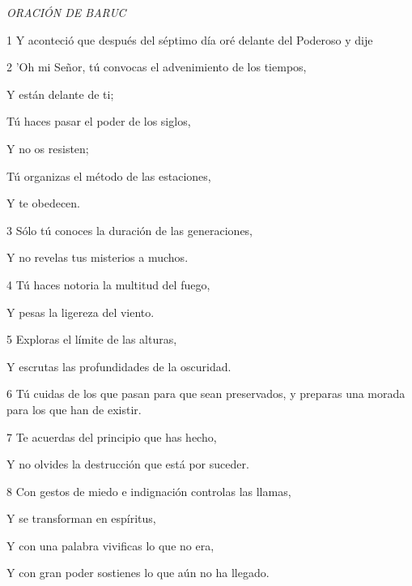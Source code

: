 \par \textit{ORACIÓN DE BARUC}

\par 1 Y aconteció que después del séptimo día oré delante del Poderoso y dije

\par 2 'Oh mi Señor, tú convocas el advenimiento de los tiempos,

\par Y están delante de ti;

Tú haces pasar el poder de los siglos,

\par Y no os resisten;

\par Tú organizas el método de las estaciones,

\par Y te obedecen.

\par 3 Sólo tú conoces la duración de las generaciones,

\par Y no revelas tus misterios a muchos.

\par 4 Tú haces notoria la multitud del fuego,

\par Y pesas la ligereza del viento.

\par 5 Exploras el límite de las alturas,

\par Y escrutas las profundidades de la oscuridad.

\par 6 Tú cuidas de los que pasan para que sean preservados, y preparas una morada para los que han de existir.

\par 7 Te acuerdas del principio que has hecho,

Y no olvides la destrucción que está por suceder.

\par 8 Con gestos de miedo e indignación controlas las llamas,

\par Y se transforman en espíritus,

\par Y con una palabra vivificas lo que no era,

\par Y con gran poder sostienes lo que aún no ha llegado.

